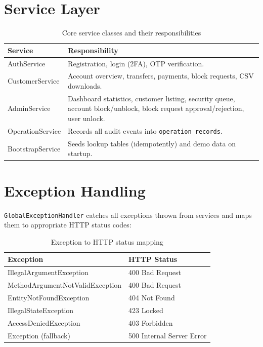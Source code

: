 \documentclass[12pt,a4paper]{report}
\begin{document}
\section{Service Layer}

\begin{table}[H]
  \centering
  \caption{Core service classes and their responsibilities}
  \begin{tabular}{lp{9cm}}
    \toprule
    \textbf{Service} & \textbf{Responsibility} \\
    \midrule
    AuthService       & Registration, login (2FA), OTP verification. \\
    CustomerService   & Account overview, transfers, payments, block requests,
                        CSV downloads. \\
    AdminService      & Dashboard statistics, customer listing, security queue,
                        account block/unblock, block request approval/rejection,
                        user unlock. \\
    OperationService  & Records all audit events into \texttt{operation\_records}. \\
    BootstrapService  & Seeds lookup tables (idempotently) and demo data on startup. \\
    \bottomrule
  \end{tabular}
\end{table}

\section{Exception Handling}

\texttt{GlobalExceptionHandler} catches all exceptions thrown from services and maps
them to appropriate HTTP status codes:

\begin{table}[H]
  \centering
  \caption{Exception to HTTP status mapping}
  \begin{tabular}{ll}
    \toprule
    \textbf{Exception} & \textbf{HTTP Status} \\
    \midrule
    IllegalArgumentException          & 400 Bad Request \\
    MethodArgumentNotValidException   & 400 Bad Request \\
    EntityNotFoundException           & 404 Not Found \\
    IllegalStateException             & 423 Locked \\
    AccessDeniedException             & 403 Forbidden \\
    Exception (fallback)              & 500 Internal Server Error \\
    \bottomrule
  \end{tabular}
\end{table}
\end{document}
